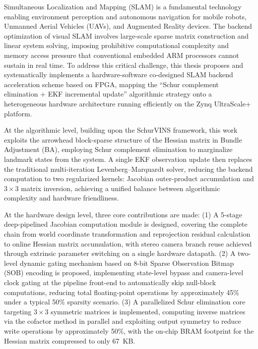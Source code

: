 Simultaneous Localization and Mapping (SLAM) is a fundamental technology enabling environment perception and autonomous navigation for mobile robots, Unmanned Aerial Vehicles (UAVs), and Augmented Reality devices. The backend optimization of visual SLAM involves large-scale sparse matrix construction and linear system solving, imposing prohibitive computational complexity and memory access pressure that conventional embedded ARM processors cannot sustain in real time. To address this critical challenge, this thesis proposes and systematically implements a hardware-software co-designed SLAM backend acceleration scheme based on FPGA, mapping the ``Schur complement elimination + EKF incremental update'' algorithmic strategy onto a heterogeneous hardware architecture running efficiently on the Zynq UltraScale+ platform.

At the algorithmic level, building upon the SchurVINS framework, this work exploits the arrowhead block-sparse structure of the Hessian matrix in Bundle Adjustment (BA), employing Schur complement elimination to marginalize landmark states from the system. A single EKF observation update then replaces the traditional multi-iteration Levenberg--Marquardt solver, reducing the backend computation to two regularized kernels: Jacobian outer-product accumulation and $3 \times 3$ matrix inversion, achieving a unified balance between algorithmic complexity and hardware friendliness.

At the hardware design level, three core contributions are made: (1) A 5-stage deep-pipelined Jacobian computation module is designed, covering the complete chain from world coordinate transformation and reprojection residual calculation to online Hessian matrix accumulation, with stereo camera branch reuse achieved through extrinsic parameter switching on a single hardware datapath. (2) A two-level dynamic gating mechanism based on 8-bit Sparse Observation Bitmap (SOB) encoding is proposed, implementing state-level bypass and camera-level clock gating at the pipeline front-end to automatically skip null-block computations, reducing total floating-point operations by approximately 45\% under a typical 50\% sparsity scenario. (3) A parallelized Schur elimination core targeting $3 \times 3$ symmetric matrices is implemented, computing inverse matrices via the cofactor method in parallel and exploiting output symmetry to reduce write operations by approximately 50\%, with the on-chip BRAM footprint for the Hessian matrix compressed to only 67~KB.

